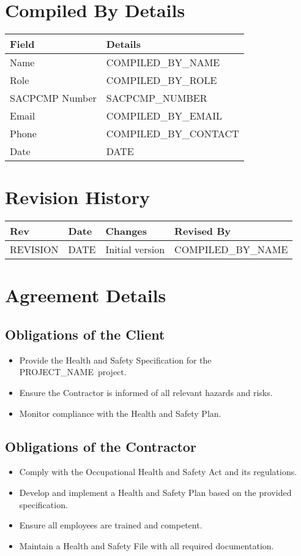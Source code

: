 \documentclass[11pt]{article}
\newcommand{\issueDate}{{{DATE}}}
\newcommand{\projectName}{{{PROJECT_NAME}}}
\newcommand{\compilerName}{{{COMPILED_BY_NAME}}}
\newcommand{\compilerRole}{{{COMPILED_BY_ROLE}}}
\newcommand{\compilerSACPCMP}{{{SACPCMP_NUMBER}}}
\newcommand{\compilerEmail}{{{COMPILED_BY_EMAIL}}}
\newcommand{\compilerPhone}{{{COMPILED_BY_CONTACT}}}
\newcommand{\revision}{{{REVISION}}}
\begin{document}
\section{Compiled By Details}
\begin{tabularx}{\textwidth}{lX}
  \toprule
  \textbf{Field} & \textbf{Details} \\
  \midrule
  Name & \compilerName \\
  Role & \compilerRole \\
  SACPCMP Number & \compilerSACPCMP \\
  Email & \compilerEmail \\
  Phone & \compilerPhone \\
  Date & \issueDate \\
  \bottomrule
\end{tabularx}

\section{Revision History}
\begin{tabularx}{\textwidth}{lXll}
  \toprule
  \textbf{Rev} & \textbf{Date} & \textbf{Changes} & \textbf{Revised By} \\
  \midrule
  \revision & \issueDate & Initial version & \compilerName \\
  \bottomrule
\end{tabularx}

\section{Agreement Details}
\subsection{Obligations of the Client}
\begin{itemize}
    \item Provide the Health and Safety Specification for the \projectName\ project.
    \item Ensure the Contractor is informed of all relevant hazards and risks.
    \item Monitor compliance with the Health and Safety Plan.
\end{itemize}

\subsection{Obligations of the Contractor}
\begin{itemize}
    \item Comply with the Occupational Health and Safety Act and its regulations.
    \item Develop and implement a Health and Safety Plan based on the provided specification.
    \item Ensure all employees are trained and competent.
    \item Maintain a Health and Safety File with all required documentation.
\end{itemize}
\end{document}
